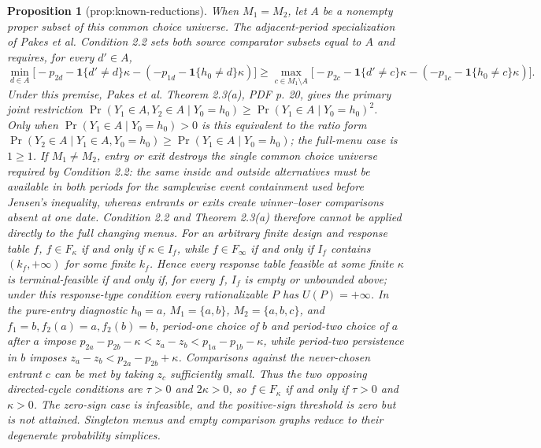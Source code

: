 \documentclass{article}
\newtheorem{proposition}{Proposition}
\begin{document}
\begin{proposition}[prop:known-reductions]\label{prop:known-reductions}
When \(M_1=M_2\), let \(A\) be a nonempty proper subset of this common choice universe. The adjacent-period specialization of Pakes et al. Condition 2.2 sets both source comparator subsets equal to \(A\) and requires, for every \(d'\in A\), \[\min_{d\in A}\bigl[-p_{2d}-\mathbf 1\{d'\ne d\}\kappa-(-p_{1d}-\mathbf 1\{h_0\ne d\}\kappa)\bigr]\ge\max_{c\in M_1\setminus A}\bigl[-p_{2c}-\mathbf 1\{d'\ne c\}\kappa-(-p_{1c}-\mathbf 1\{h_0\ne c\}\kappa)\bigr].\] Under this premise, Pakes et al. Theorem 2.3(a), PDF p. 20, gives the primary joint restriction \(\Pr(Y_1\in A,Y_2\in A\mid Y_0=h_0)\ge\Pr(Y_1\in A\mid Y_0=h_0)^2\). Only when \(\Pr(Y_1\in A\mid Y_0=h_0)>0\) is this equivalent to the ratio form \(\Pr(Y_2\in A\mid Y_1\in A,Y_0=h_0)\ge\Pr(Y_1\in A\mid Y_0=h_0)\); the full-menu case is \(1\ge1\). If \(M_1\ne M_2\), entry or exit destroys the single common choice universe required by Condition 2.2: the same inside and outside alternatives must be available in both periods for the samplewise event containment used before Jensen's inequality, whereas entrants or exits create winner--loser comparisons absent at one date. Condition 2.2 and Theorem 2.3(a) therefore cannot be applied directly to the full changing menus. For an arbitrary finite design and response table \(f\), \(f\in F_\kappa\) if and only if \(\kappa\in I_f\), while \(f\in F_\infty\) if and only if \(I_f\) contains \((k_f,+\infty)\) for some finite \(k_f\). Hence every response table feasible at some finite \(\kappa\) is terminal-feasible if and only if, for every \(f\), \(I_f\) is empty or unbounded above; under this response-type condition every rationalizable \(P\) has \(U(P)=+\infty\). In the pure-entry diagnostic \(h_0=a\), \(M_1=\{a,b\}\), \(M_2=\{a,b,c\}\), and \(f_1=b,f_2(a)=a,f_2(b)=b\), period-one choice of \(b\) and period-two choice of \(a\) after \(a\) impose \(p_{2a}-p_{2b}-\kappa<z_a-z_b<p_{1a}-p_{1b}-\kappa\), while period-two persistence in \(b\) imposes \(z_a-z_b<p_{2a}-p_{2b}+\kappa\). Comparisons against the never-chosen entrant \(c\) can be met by taking \(z_c\) sufficiently small. Thus the two opposing directed-cycle conditions are \(\tau>0\) and \(2\kappa>0\), so \(f\in F_\kappa\) if and only if \(\tau>0\) and \(\kappa>0\). The zero-sign case is infeasible, and the positive-sign threshold is zero but is not attained. Singleton menus and empty comparison graphs reduce to their degenerate probability simplices.
\end{proposition}
\end{document}
